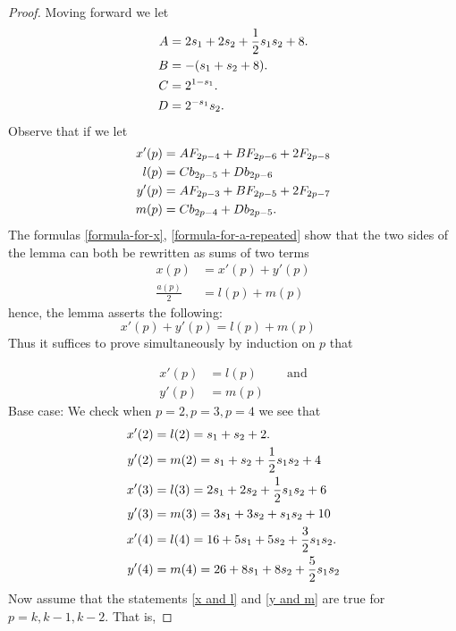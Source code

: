 \documentclass[10pt,reqno]{amsart}
\begin{document}
\begin{proof}
Moving forward we let 
\begin{align}
    A & = 2s_1+2s_2+\displaystyle\frac{1}{2}s_1s_2+8.\notag\\
    B &= -(s_1+s_2+8)\notag.\\
    C &= 2^{1-s_1}.\notag\\
D &= 2^{-s_1}s_2.\notag
\end{align}
Observe that if we let
\begin{align}
    x'(p)&= AF_{2p-4}+BF_{2p-6}+2F_{2p-8}\notag\\
    l(p)&=Cb_{2p-5}+Db_{2p-6}\notag\\
y'(p)&= AF_{2p-3}+BF_{2p-5}+2F_{2p-7}\notag\\
m(p)&=Cb_{2p-4}+Db_{2p-5}.\notag
\end{align}
The formulas \eqref{formula-for-x}, \eqref{formula-for-a-repeated} show that
the two sides of the lemma can both be rewritten as sums of two terms 
\begin{align}   
x(p)&=x'(p)+y'(p)\\
\frac{a(p)}{2}&=l(p)+m(p)
\end{align} 
hence, the lemma asserts the following:
\begin{equation}
   x'(p)+y'(p) =l(p)+m(p) \label{x'_y'} \hspace{1cm}
\end{equation}
Thus it suffices to prove simultaneously by induction on $p$ that

\begin{align}    
x'(p) &= l(p) \label{x and l} \hspace{1cm} \text{and}\\
y'(p) &= m(p) \label{y and m}  
\end{align}
Base case: We check when $p = 2, p=3, p=4$ we see that 
\begin{align}  
x'(2) &= l(2) = s_1 +s_2 + 2.\notag\\
y'(2) &= m(2)   = s_1+ s_2+\displaystyle\frac{1}{2}s_1s_2+4\notag\\
x'(3) &= l(3) = 2s_1 +2s_2 +\displaystyle\frac{1}{2}s_1s_2+6\notag\\
y'(3) &= m(3)   = 3s_1+ 3s_2+s_1s_2+10\notag\\
x'(4) &= l(4) = 16+5s_1 +5s_2 + \displaystyle\frac{3}{2}s_1s_2.\notag\\
y'(4) &= m(4)   = 26+8s_1+8s_2+\displaystyle\frac{5}{2}s_1s_2\notag\\
\end{align}
Now assume that the statements  \eqref{x and l} and \eqref{y and m}
are true for $p = k, k-1, k-2.$ That is, 


\end{proof}
\end{document}
